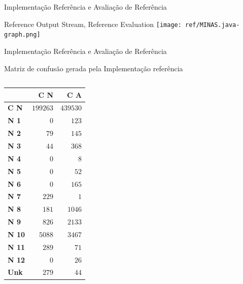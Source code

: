 \documentclass[aspectratio=43,10pt]{beamer}
\begin{document}
\begin{frame}[fragile]{Implementação Referência e Avaliação de Referência}
  \begin{alertblock}{Reference Output Stream, Reference Evaluation}
    \texttt{[image: ref/MINAS.java-graph.png]}
  \end{alertblock}
\end{frame}

\begin{frame}[fragile]{Implementação Referência e Avaliação de Referência}
  \begin{alertblock}{Matriz de confusão gerada pela Implementação referência}
    \vspace{0.5em}
    
    \begin{columns}[T,onlytextwidth]
      \small{
      \begin{tabular}{ l| r| r }
                       & \textbf{C N} & \textbf{C A}\\ \hline \hline
        \textbf{C N }  & $199263$    & $439530$    \\ \hline
        \textbf{N 1 }  & $0$         & $123$       \\ \hline
        \textbf{N 2 }  & $79$        & $145$       \\ \hline
        \textbf{N 3 }  & $44$        & $368$       \\ \hline
        \textbf{N 4 }  & $0$         & $8$         \\ \hline
        \textbf{N 5 }  & $0$         & $52$        \\ \hline
        \textbf{N 6 }  & $0$         & $165$       \\ \hline
        \textbf{N 7 }  & $229$       & $1$         \\ \hline
        \textbf{N 8 }  & $181$       & $1046$      \\ \hline
        \textbf{N 9 }  & $826$       & $2133$      \\ \hline
        \textbf{N 10}  & $5088$      & $3467$      \\ \hline
        \textbf{N 11}  & $289$       & $71$        \\ \hline
        \textbf{N 12}  & $0$         & $26$        \\ \hline
        \textbf{Unk }  & $279$       & $44$        \\
      \end{tabular}
      }


\end{columns}
\end{alertblock}
\end{frame}
\end{document}
